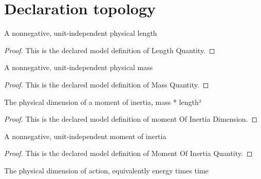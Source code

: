 \section{Declaration topology}
\begin{definition}
  \label{def:physics:phyx-mini-0605:phyxminiproblems-problemphyxmini0605-lengthquantity}
  A nonnegative, unit-independent physical length
\end{definition}
\begin{proof}
  This is the declared model definition of Length Quantity.
\end{proof}
\begin{definition}
  \label{def:physics:phyx-mini-0605:phyxminiproblems-problemphyxmini0605-massquantity}
  A nonnegative, unit-independent physical mass
\end{definition}
\begin{proof}
  This is the declared model definition of Mass Quantity.
\end{proof}
\begin{definition}
  \label{def:physics:phyx-mini-0605:phyxminiproblems-problemphyxmini0605-momentofinertiadimension}
  The physical dimension of a moment of inertia, mass * length²
\end{definition}
\begin{proof}
  This is the declared model definition of moment Of Inertia Dimension.
\end{proof}
\begin{definition}
  \label{def:physics:phyx-mini-0605:phyxminiproblems-problemphyxmini0605-momentofinertiaquantity}
  A nonnegative, unit-independent moment of inertia
\end{definition}
\begin{proof}
  This is the declared model definition of Moment Of Inertia Quantity.
\end{proof}
\begin{definition}
  \label{def:physics:phyx-mini-0605:phyxminiproblems-problemphyxmini0605-actiondimension}
  The physical dimension of action, equivalently energy times time
\end{definition}
